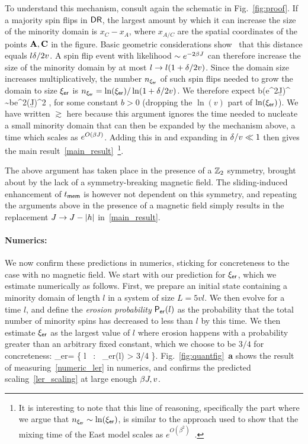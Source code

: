 \documentclass[prl,aps,twocolumn,groupedaddress,superscriptaddress,preprintnumbers,nobibnotes]{revtex4-2}
\newcommand{\tmem}{{t_{\sf mem}}}
\newcommand{\ler}{{\xi_{\sf er}}} %
\newcommand{\dr}{{\sfD \sfR}}
\begin{document}
	To understand this mechanism, consult again the schematic in Fig.~\ref{fig:proof}. If a majority spin flips in $\dr$, the largest amount by which it can increase the size of the minority domain is $x_C - x_A$, where $x_{A/C}$ are the spatial coordinates of the points $\mathbf{A},\mathbf{C}$ in the figure. Basic geometric considerations show~\cite{code} that this distance equals $l\delta /2v$. A spin flip event with likelihood $\sim e^{-2\beta J}$ can therefore increase the size of the minority domain by at most $l \rightarrow l(1+\delta /2v)$. Since the domain size increases multiplicatively, the number $n_\ler$ of such spin flips needed to grow the domain to size $\ler$ is $n_\ler = \ln(\ler) / \ln(1+\d/2v)$. We therefore expect 
	\be \tmem \gtrsim b(e^{2\b J})^{\frac{\ln (\ler)}{\ln(1+\d/2v)}} \sim be^{2(\b J)^2 },\ee 
	for some constant $b>0$ (dropping the $\ln(v)$ part of $\ln(\ler)$). We have written $\gtrsim$ here because this argument ignores the time needed to nucleate a small minority domain that can then be expanded by the mechanism above, a time which scales as $e^{O(\beta J)}$. Adding this in and expanding in $\delta /v \ll 1$ then gives the main result~\eqref{main_result}~\footnote{It is interesting to note that this line of reasoning, specifically the part where we argue that $n_\ler \sim \ln(\ler)$, is similar to the approach used to show that the mixing time of the East model scales as $e^{O(\beta^2)}$~\cite{garrahan2011kinetically}.}. 
	
	The above argument has taken place in the presence of a $\mathbb{Z}_2$ symmetry, brought about by the lack of a symmetry-breaking magnetic field. The sliding-induced enhancement of $\tmem$ is however not dependent on this symmetry, and repeating the arguments above in the presence of a magnetic field simply results in the replacement $J \rightarrow J - |h|$ in~\eqref{main_result}. 
	
	
	
	\paragraph*{Numerics: }
	We now confirm these predictions in numerics, sticking for concreteness to the case with no magnetic field. We start with our prediction for $\ler$, which we estimate numerically as follows. First, we prepare an initial state containing a minority domain of length $l$ in a system of size $L = 5 v l$. We then evolve for a time $l$, and define the {\it erosion probability} $\mathsf{P}_{\sf er}(l)$ as the probability that the total number of minority spins has decreased to less than $l$ by this time. We then estimate $\ler$ as the largest value of $l$ where erosion happens with a probability greater than an arbitrary fixed constant, which we choose to be $3/4$ for concreteness: 
	\be \label{numeric_ler} \ler =  \max \{ l \, : \, \sfP_{\sf er}(l) > 3/4 \}.\ee
	Fig.~\ref{fig:quantfig}~{\bf a} shows the result of measuring~\eqref{numeric_ler} in numerics, and confirms the predicted scaling~\eqref{ler_scaling} at large enough $\beta J, v$. 
	
\end{document}
